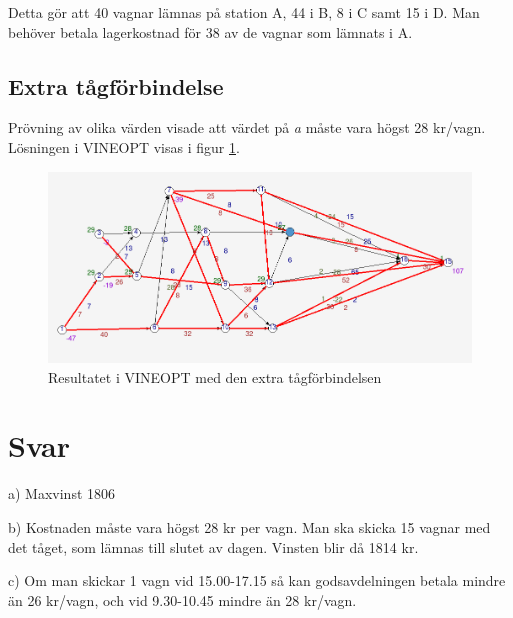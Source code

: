 \documentclass[a4paper,titlepage,12pt]{article}
\begin{document}
Detta gör att 40 vagnar lämnas på station A, 44 i B, 8 i C samt 15 i D. Man
behöver betala lagerkostnad för 38 av de vagnar som lämnats i A.

\subsection*{Extra tågförbindelse}
Prövning av olika värden visade att värdet på \textit{a} måste vara högst 28
kr/vagn. Lösningen i VINEOPT visas i figur \ref{resfig2}.

\begin{figure}[h]
    \begin{centering}
        \includegraphics[width=15cm]{res2.png}
        \caption{Resultatet i VINEOPT med den extra tågförbindelsen\label{resfig2}}
    \end{centering}
\end{figure}

\newpage
\section*{Svar}

a) Maxvinst 1806

b) Kostnaden måste vara högst 28 kr per vagn. Man ska skicka 15 vagnar
med det tåget, som lämnas till slutet av dagen. Vinsten blir då 1814 kr.

c) Om man skickar 1 vagn vid 15.00-17.15 så kan godsavdelningen betala mindre än 26
kr/vagn, och vid 9.30-10.45 mindre än 28 kr/vagn.
\end{document}

